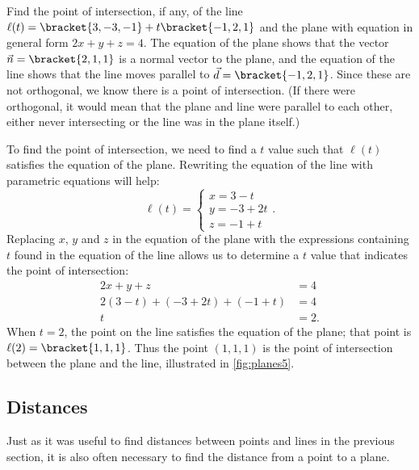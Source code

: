 \begin{example}\label{ex_planes5}
Find the point of intersection, if any, of the line $\ell(t) =\bracket{3,-3,-1}+t\bracket{-1,2,1}$ and the plane with equation in general form $2x+y+z=4$.
\solution
The equation of the plane shows that the vector $\vec n =\bracket{2,1,1}$ is a normal vector to the plane, and the equation of the line shows that the line moves parallel to $\vec d =\bracket{-1,2,1}$. Since these are not orthogonal, we know there is a point of intersection. (If there were orthogonal, it would mean that the plane and line were parallel to each other, either never intersecting or the line was in the plane itself.)

To find the point of intersection, we need to find a $t$ value such that $\ell(t)$ satisfies the equation of the plane. Rewriting the equation of the line with parametric equations will help:
\[\ell(t) = \begin{cases}x=3-t\\y=-3+2t\\z=-1+t\end{cases}.\]%
%
Replacing $x$, $y$ and $z$ in the equation of the plane with the expressions containing $t$ found in the equation of the line allows us to determine a $t$ value that indicates the point of intersection:
\begin{align*}
2x+y+z &=4 \\
2(3-t) + (-3+2t) + (-1+t) &= 4 \\
t&=2.
\end{align*}
When $t=2$, the point on the line satisfies the equation of the plane; that point is $\ell(2) =\bracket{1,1,1}$. Thus the point $(1,1,1)$ is the point of intersection between the plane and the line, illustrated in \autoref{fig:planes5}.
\end{example}

\subsection{Distances}

Just as it was useful to find distances between points and lines in the previous section, it is also often necessary to find the distance from a point to a plane.

